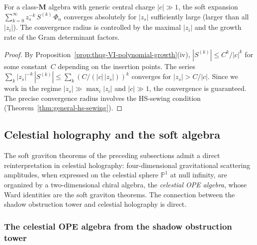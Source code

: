 \begin{corollary}
\label{cor:thqg-VI-soft-convergence}
For a class-$\mathbf{M}$ algebra with generic central charge
$|c| \gg 1$, the soft expansion
$\sum_{k=0}^{\infty} z_s^{-k}\,S^{(k)}\,\Phi_n$
converges absolutely for $|z_s|$ sufficiently large (larger than
all $|z_i|$). The convergence radius is controlled by the
maximal $|z_i|$ and the growth rate of the Gram determinant
factors.
\end{corollary}

\begin{proof}
By Proposition~\ref{prop:thqg-VI-polynomial-growth}(iv),
$|S^{(k)}| \leq C^k / |c|^k$ for some constant~$C$ depending on
the insertion points. The series
$\sum_k |z_s|^{-k}\,|S^{(k)}| \leq \sum_k (C/(|c|\,|z_s|))^k$
converges for $|z_s| > C/|c|$. Since we work in the regime
$|z_s| \gg \max_i |z_i|$ and $|c| \gg 1$, the convergence is
guaranteed. The precise convergence radius involves the HS-sewing
condition (Theorem~\ref{thm:general-hs-sewing}).
\end{proof}

%
%

\subsection{Celestial holography and the soft algebra}
\label{subsec:thqg-VI-celestial}

The soft graviton theorems of the preceding subsections admit a
direct reinterpretation in celestial holography:
four-dimensional gravitational scattering amplitudes, when
expressed on the celestial sphere $\mathbb{P}^1$ at null infinity,
are organized by a two-dimensional chiral algebra, the
\emph{celestial OPE algebra}, whose Ward identities are the soft
graviton theorems. The connection between
the shadow obstruction tower and celestial holography is direct.

\subsubsection{The celestial OPE algebra from the shadow obstruction tower}

